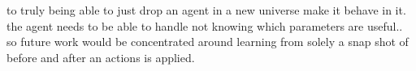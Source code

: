 	
 to truly being able to just drop an agent in a new universe make it behave in it. the agent needs to be able to handle not knowing which parameters are useful.. so future work would be concentrated around learning from solely a snap shot of before and after an actions is applied. 

	
	